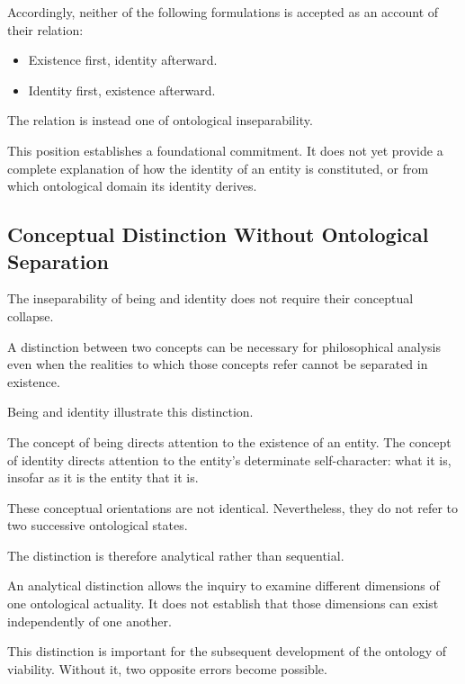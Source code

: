 Accordingly, neither of the following formulations
is accepted as an account of their relation:

\begin{itemize}
    \item Existence first, identity afterward.
    \item Identity first, existence afterward.
\end{itemize}

The relation is instead one of ontological
inseparability.

This position establishes a foundational
commitment. It does not yet provide a complete
explanation of how the identity of an entity is
constituted, or from which ontological domain
its identity derives.



\subsection{Conceptual Distinction Without Ontological Separation}
\label{subsec:conceptual-distinction-without-separation}

The inseparability of being and identity does not
require their conceptual collapse.

A distinction between two concepts can be necessary
for philosophical analysis even when the realities
to which those concepts refer cannot be separated
in existence.

Being and identity illustrate this distinction.

The concept of being directs attention to the
existence of an entity. The concept of identity
directs attention to the entity's determinate
self-character: what it is, insofar as it is the
entity that it is.

These conceptual orientations are not identical.
Nevertheless, they do not refer to two successive
ontological states.

The distinction is therefore analytical rather
than sequential.

An analytical distinction allows the inquiry to
examine different dimensions of one ontological
actuality. It does not establish that those
dimensions can exist independently of one another.

This distinction is important for the subsequent
development of the ontology of viability. Without
it, two opposite errors become possible.

